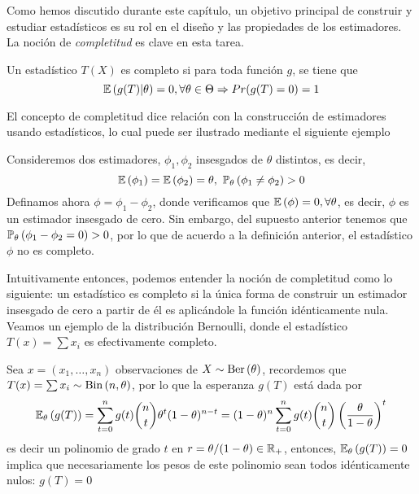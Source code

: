 Como hemos discutido durante este capítulo, un objetivo principal de construir y estudiar estadísticos es su rol en el diseño y las propiedades de los estimadores. La noción de \textit{completitud} es clave en esta tarea. 

\begin{definition}
	Un estadístico $T(X)$ es completo si para toda función $g$, se tiene que 
	\begin{equation}
		\mathbb{E} \left(g(T)|\theta\right) = 0, \forall \theta\in\Theta \Rightarrow Pr(g(T)=0) = 1
	\end{equation}
	
\end{definition}
El concepto de completitud dice relación con la construcción de estimadores usando estadísticos, lo cual puede ser ilustrado mediante el siguiente ejemplo

\begin{example}
	Consideremos dos estimadores, $\phi_1, \phi_2$ insesgados de $\theta$ distintos, es decir, 
	\begin{equation}
	\mathbb{E} \left(\phi_1\right) = \mathbb{E} \left(\phi_2\right) = \theta, \ \mathbb{P}_\theta \left(\phi_1\neq \phi_2\right) > 0
	\end{equation}
	Definamos ahora $\phi = \phi_1 - \phi_2$, donde verificamos que $\mathbb{E} \left(\phi\right) = 0, \forall \theta$, es decir, $\phi$ es un estimador insesgado de cero. Sin embargo, del supuesto anterior tenemos que $\mathbb{P}_\theta \left(\phi_1 - \phi_2=0\right)>0$, por lo que de acuerdo a la definición anterior, el estadístico $\phi$ no es completo. 
\end{example}
Intuitivamente entonces, podemos entender la noción de completitud como lo siguiente: un estadístico es completo si la única forma de construir un estimador insesgado de cero a partir de él es aplicándole la función idénticamente nula.  Veamos un ejemplo de la distribución Bernoulli, donde el estadístico $T(x) = \sum x_i$ es efectivamente completo. 

\begin{example}
	Sea $x=(x_1,\ldots,x_n)$ observaciones de $X\sim\text{Ber}\left(\theta\right)$, recordemos que $T(x) = \sum x_i\sim\text{Bin}\left(n,\theta\right)$, por lo que la esperanza $g(T)$ está dada por
	\begin{equation}
		\mathbb{E}_\theta \left(g(T)\right) = \sum_{t=0}^n g(t)\binom{n}{t}\theta^t(1-\theta)^{n-t}= (1-\theta)^n\sum_{t=0}^n g(t)\binom{n}{t}\left(\frac{\theta}{1-\theta}\right)^t
	\end{equation}
	es decir un polinomio de grado $t$ en $r=\theta/(1-\theta)\in{\mathbb R}_+$, entonces, $\mathbb{E}_\theta \left(g(T)\right) = 0$ implica que necesariamente los pesos de este polinomio sean todos idénticamente nulos: ${g(T)} = 0$
\end{example}


